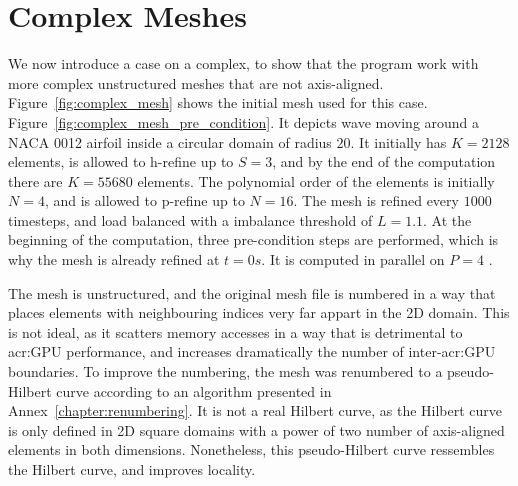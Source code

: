 \section{Complex Meshes}\label{section:results:complex_meshes}

We now introduce a case on a complex, to show that the program work with more complex unstructured
meshes that are not axis-aligned. Figure~\ref{fig:complex_mesh} shows the initial mesh used for this
case. Figure~\ref{fig:complex_mesh_pre_condition}. It depicts wave moving around a NACA 0012 airfoil
inside a circular domain of radius \(20\). It initially has \(K = 2128\) elements, is allowed to
h-refine up to \(S = 3\), and by the end of the computation there are \(K = 55680\) elements. The
polynomial order of the elements is initially \(N = 4\), and is allowed to p-refine up to \(N =
16\). The mesh is refined every \(1000\) timesteps, and load balanced with a imbalance threshold of
\(L = 1.1\). At the beginning of the computation, three pre-condition steps are performed, which is
why the mesh is already refined at \(t = 0 s\). It is computed in parallel on \(P = 4\)
.

The mesh is unstructured, and the original mesh file is numbered in a way that places elements with
neighbouring indices very far appart in the 2D domain. This is not ideal, as it scatters memory
accesses in a way that is detrimental to \acrshort{acr:GPU} performance, and increases dramatically
the number of inter-\acrshort{acr:GPU} boundaries. To improve the numbering, the mesh was renumbered
to a pseudo-Hilbert curve according to an algorithm presented in Annex~\ref{chapter:renumbering}. It
is not a real Hilbert curve, as the Hilbert curve is only defined in 2D square domains with a power
of two number of axis-aligned elements in both dimensions. Nonetheless, this pseudo-Hilbert curve
ressembles the Hilbert curve, and improves locality.

